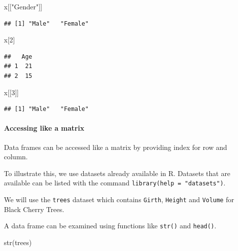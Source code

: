 \documentclass[
]{book}
\newenvironment{Shaded}{\begin{snugshade}}{\end{snugshade}}
\newcommand{\DecValTok}[1]{\textcolor[rgb]{0.00,0.00,0.81}{#1}}
\newcommand{\FunctionTok}[1]{\textcolor[rgb]{0.00,0.00,0.00}{#1}}
\newcommand{\NormalTok}[1]{#1}
\newcommand{\StringTok}[1]{\textcolor[rgb]{0.31,0.60,0.02}{#1}}
\theoremstyle{definition}
\theoremstyle{definition}
\theoremstyle{definition}
\theoremstyle{definition}
\theoremstyle{remark}
\begin{document}
\begin{Shaded}
\begin{Highlighting}[]
\NormalTok{x[[}\StringTok{"Gender"}\NormalTok{]]}
\end{Highlighting}
\end{Shaded}

\begin{verbatim}
## [1] "Male"   "Female"
\end{verbatim}

\begin{Shaded}
\begin{Highlighting}[]
\NormalTok{x[}\DecValTok{2}\NormalTok{]}
\end{Highlighting}
\end{Shaded}

\begin{verbatim}
##   Age
## 1  21
## 2  15
\end{verbatim}

\begin{Shaded}
\begin{Highlighting}[]
\NormalTok{x[[}\DecValTok{3}\NormalTok{]]}
\end{Highlighting}
\end{Shaded}

\begin{verbatim}
## [1] "Male"   "Female"
\end{verbatim}

\hypertarget{accessing-like-a-matrix}{%
\paragraph{Accessing like a matrix}\label{accessing-like-a-matrix}}

Data frames can be accessed like a matrix by providing index for row and column.

To illustrate this, we use datasets already available in R. Datasets that are available can be listed with the command \texttt{library(help\ =\ "datasets")}.

We will use the \texttt{trees} dataset which contains \texttt{Girth}, \texttt{Height} and \texttt{Volume} for Black Cherry Trees.

A data frame can be examined using functions like \texttt{str()} and \texttt{head()}.

\begin{Shaded}
\begin{Highlighting}[]
\FunctionTok{str}\NormalTok{(trees)}
\end{Highlighting}
\end{Shaded}
\end{document}
